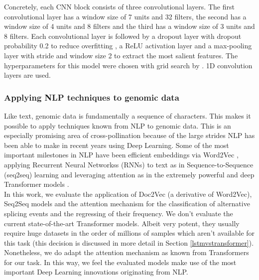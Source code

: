Concretely, each CNN block consists of three convolutional layers. The first convolutional layer has a window size of 7 units and 32 filters, the second has a window size of 4 units and 8 filters and the third has a window size of 3 units and 8 filters. Each convolutional layer is followed by a dropout layer with dropout probability 0.2 to reduce overfitting \cite{dropout}, a ReLU activation layer \cite{relu} and a max-pooling layer with stride and window size 2 to extract the most salient features. The hyperparameters for this model were chosen with grid search by \cite{dsc}. 1D convolution layers are used. 





\subsubsection{Applying NLP techniques to genomic data}
Like text, genomic data is fundamentally a sequence of characters.
This makes it possible to apply techniques known from NLP to genomic data. This is an especially promising area of cross-pollination because of the large strides NLP has been able to make in recent years using Deep Learning.
Some of the most important milestones in NLP have been efficient embeddings via Word2Vec \cite{w2v1} \cite{w2v2}, applying Recurrent Neural Networkss (RNNs) to text as in Sequence-to-Sequence (seq2seq) learning \cite{seq2seq} and leveraging attention as in the extremely powerful and deep Transformer models \cite{allyouneed} \cite{bert}.\\
In this work, we evaluate the application of Doc2Vec (a derivative of Word2Vec), Seq2Seq models and the attention mechanism for the classification of alternative splicing events and the regressing of their frequency. We don't evaluate the current state-of-the-art Transformer models. Albeit very potent, they usually require huge datasets in the order of millions of samples which aren't available for this task (this decision is discussed in more detail in Section \ref{lstmvstransformer}). Nonetheless, we do adapt the attention mechanism as known from Transformers for our task. In this way, we feel the evaluated models make use of the most important Deep Learning innovations originating from NLP.


